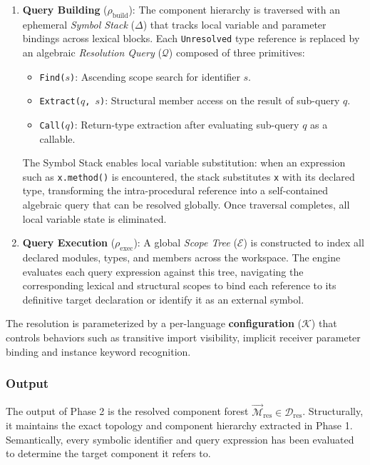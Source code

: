\begin{enumerate}
  \item \textbf{Query Building} ($\rho_{\text{build}}$): The component hierarchy
    is traversed with an ephemeral \textit{Symbol Stack} ($\Delta$)
    that tracks local variable and parameter bindings across lexical blocks.
    Each \texttt{Unresolved} type reference is replaced by an algebraic
    \textit{Resolution Query} ($\mathcal{Q}$) composed of three primitives:
    \begin{itemize}
      \item \texttt{Find($s$)}: Ascending scope search for identifier $s$.
      \item \texttt{Extract($q$, $s$)}: Structural member access on
        the result of sub-query $q$.
      \item \texttt{Call($q$)}: Return-type extraction after
        evaluating sub-query $q$ as a callable.
    \end{itemize}
    The Symbol Stack enables local variable substitution: when an expression
    such as \texttt{x.method()} is encountered, the stack substitutes
    \texttt{x} with its declared type, transforming the intra-procedural
    reference into a self-contained algebraic query that can be resolved
    globally. Once traversal completes, all local variable state is eliminated.

  \item \textbf{Query Execution} ($\rho_{\text{exec}}$): A global \textit{Scope
    Tree} ($\mathcal{E}$) is constructed to index all declared modules, types,
    and members across the workspace. The engine evaluates each query
    expression against this tree, navigating the corresponding lexical and
    structural scopes to bind each reference to its definitive target
    declaration
    or identify it as an external symbol.
\end{enumerate}

The resolution is parameterized by a per-language
\textbf{configuration} ($\mathcal{K}$) that controls behaviors
such as transitive import visibility, implicit receiver parameter
binding and instance keyword recognition.

\subsubsection{Output}

The output of Phase 2 is the resolved component forest
$\vec{\mathcal{M}}_{\text{res}} \in \mathcal{D}_{\text{res}}$. Structurally, it
maintains the exact topology and component hierarchy extracted in Phase 1.
Semantically, every symbolic identifier and query expression has been
evaluated to determine the target component it refers to.

